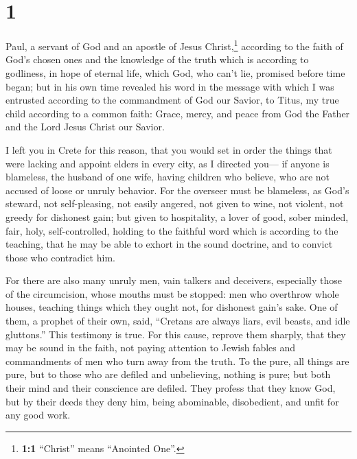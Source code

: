 \hypertarget{section}{%
\section{1}\label{section}}

 Paul, a servant of God and an apostle of Jesus
Christ,\footnote{\textbf{1:1} ``Christ'' means ``Anointed One''.}
according to the faith of God's chosen ones and the knowledge of the
truth which is according to godliness,  in hope of eternal
life, which God, who can't lie, promised before time began;
 but in his own time revealed his word in the message with
which I was entrusted according to the commandment of God our Savior,
 to Titus, my true child according to a common faith:
Grace, mercy, and peace from God the Father and the Lord Jesus Christ
our Savior.

 I left you in Crete for this reason, that you would set
in order the things that were lacking and appoint elders in every city,
as I directed you---  if anyone is blameless, the husband
of one wife, having children who believe, who are not accused of loose
or unruly behavior.  For the overseer must be blameless,
as God's steward, not self-pleasing, not easily angered, not given to
wine, not violent, not greedy for dishonest gain;  but
given to hospitality, a lover of good, sober minded, fair, holy,
self-controlled,  holding to the faithful word which is
according to the teaching, that he may be able to exhort in the sound
doctrine, and to convict those who contradict him.

 For there are also many unruly men, vain talkers and
deceivers, especially those of the circumcision,  whose
mouths must be stopped: men who overthrow whole houses, teaching things
which they ought not, for dishonest gain's sake.  One of
them, a prophet of their own, said, ``Cretans are always liars, evil
beasts, and idle gluttons.''  This testimony is true. For
this cause, reprove them sharply, that they may be sound in the faith,
 not paying attention to Jewish fables and commandments
of men who turn away from the truth.  To the pure, all
things are pure, but to those who are defiled and unbelieving, nothing
is pure; but both their mind and their conscience are defiled.
 They profess that they know God, but by their deeds they
deny him, being abominable, disobedient, and unfit for any good work.

